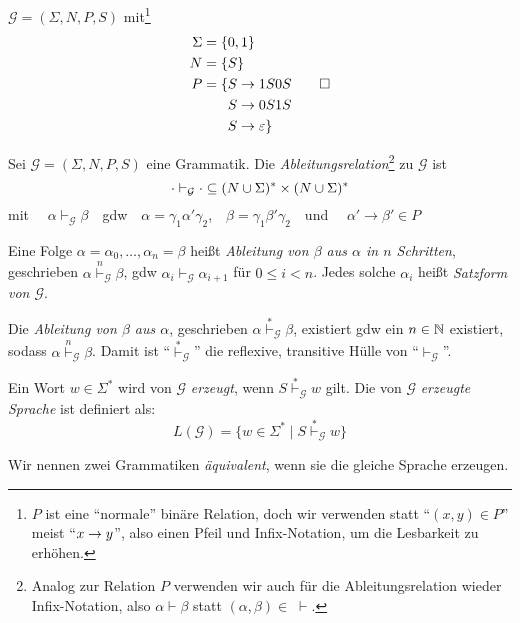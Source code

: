 \begin{Bsp}\label{bsp:3.sameNumber}
  $\mathcal{G} = (\Sigma, N, P, S)$ mit\footnote{$P$ ist eine "`normale"' binäre Relation, 
  doch wir verwenden statt "`$(x,y)\in P$"' meist "`$x\-> y$"', also einen Pfeil und Infix-Notation, um die Lesbarkeit zu erhöhen.}
	\begin{align*}
		\Sigma &= \{ 0, 1 \}\\
		N &= \{S\}\\
		P &= \begin{aligned}[t]
      \{ S & \to 1S0S \\
        S & \to 0S1S \\
        S & \to \varepsilon
      \}
        \end{aligned}
      \qedhere
	\end{align*}
\end{Bsp}
% 
%   
\begin{Def}
  Sei $\mathcal{G} =(\Sigma,N,P,S)$ eine Grammatik.
	Die \emph{Ableitungsrelation}\footnote{Analog zur Relation $P$ verwenden wir auch für die Ableitungsrelation wieder Infix-Notation, also $\alpha\vdash\beta$ statt $(\alpha,\beta)\in\;\vdash$.}
	zu $\mathcal{G}$ ist 
  \begin{displaymath}
    \cdot \vdash_\mathcal{G} \cdot \subseteq (N\cup\Sigma)^*\times(N\cup\Sigma)^*
  \end{displaymath}
  mit \ \ $\alpha \vdash_\mathcal{G} \beta$\ \  gdw\ \  $\alpha = \gamma_1\alpha'\gamma_2$,\ \  $\beta = \gamma_1\beta'\gamma_2$\ \  und \ \ $\alpha' \to \beta' \in P$

  Eine Folge $\alpha = \alpha_0,\ldots,\alpha_n = \beta$ heißt \emph{Ableitung von $\beta$ aus $\alpha$ in $n$ Schritten}, geschrieben $\alpha \stackrel{n}{\vdash}_\mathcal{G} \beta$, gdw $\alpha_i \vdash_\mathcal{G} \alpha_{i+1}$ für $0 \le i < n$.
  Jedes solche $\alpha_i$ heißt \emph{Satzform von $\mathcal{G}$}.

  Die \emph{Ableitung von $\beta$ aus $\alpha$}, geschrieben $\alpha \stackrel{*}{\vdash}_\mathcal{G} \beta$, existiert gdw ein $n \in \mathbb{N}$ existiert, sodass $\alpha \stackrel{n}{\vdash}_\mathcal{G} \beta$.
  Damit ist "`$\stackrel{*}{\vdash}_\mathcal{G}$"' die reflexive, transitive Hülle von "`$\vdash_\mathcal{G}$"'.

  Ein Wort $w\in\Sigma^*$ wird von $\mathcal{G}$ \emph{erzeugt}, wenn $S \stackrel{*}{\vdash}_{\mathcal{G}} w$ gilt.
	Die von $\mathcal{G}$ \emph{erzeugte Sprache} ist definiert als:
	\[ L(\mathcal{G}) = \{w\in\Sigma^* \mid S \stackrel{*}{\vdash}_{\mathcal{G}} w \}  \]
	
	Wir nennen zwei Grammatiken \emph{äquivalent}, wenn sie die gleiche Sprache erzeugen.
\end{Def}




